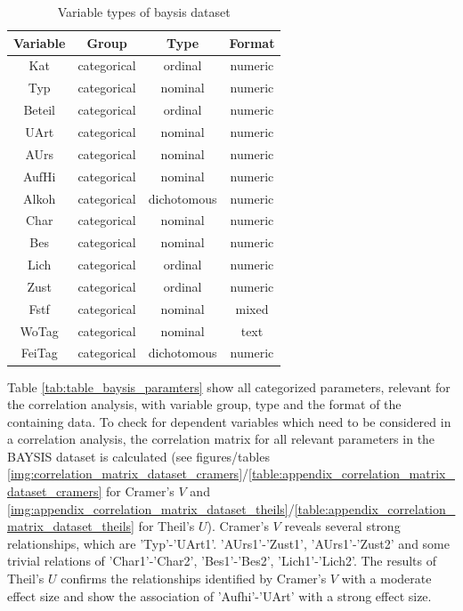 \bigskip
	
\begin{table}[ht]
	\centering
	\begin{tabular}{c|c|c|c}
		\textbf{Variable} 	& \textbf{Group} 	& \textbf{Type} & \textbf{Format} \\
		\toprule
		Kat  		& categorical 	& ordinal 	& numeric\\
		\midrule
		Typ 		& categorical 	& nominal	& numeric\\
		\midrule
		Beteil 		& categorical 	& ordinal	& numeric\\
		\midrule
		UArt 		& categorical 	& nominal	& numeric\\
		\midrule
		AUrs 		& categorical 	& nominal	& numeric\\
		\midrule
		AufHi 		& categorical 	& nominal	& numeric\\
		\midrule
		Alkoh 		& categorical 	& dichotomous	& numeric\\
		\midrule
		Char 		& categorical 	& nominal	& numeric\\
		\midrule
		Bes 		& categorical 	& nominal	& numeric\\
		\midrule
		Lich 		& categorical 	& ordinal	& numeric\\
		\midrule
		Zust 		& categorical 	& ordinal	& numeric\\
		\midrule
		Fstf 		& categorical 	& nominal	& mixed\\
		\midrule
		WoTag 		& categorical 	& nominal	& text\\
		\midrule
		FeiTag 		& categorical 	& dichotomous	& numeric\\
		\bottomrule
	\end{tabular}
	\caption{Variable types of \acrshort{baysis} dataset}
	\label{tab:table_baysis_paramters}
\end{table}

Table \autoref{tab:table_baysis_paramters} show all categorized parameters, relevant for the correlation analysis, with variable group, type and the format of the containing data. To check for dependent variables which need to be considered in a correlation analysis, the correlation matrix for all relevant parameters in the BAYSIS dataset is calculated (see figures/tables \autoref{img:correlation_matrix_dataset_cramers}/\autoref{table:appendix_correlation_matrix_dataset_cramers} for Cramer's $V$ and \autoref{img:appendix_correlation_matrix_dataset_theils}/\autoref{table:appendix_correlation_matrix_dataset_theils} for Theil's $U$). Cramer's $V$ reveals several strong relationships, which are 'Typ'-'UArt1'. 'AUrs1'-'Zust1', 'AUrs1'-'Zust2' and some  trivial relations of 'Char1'-'Char2', 'Bes1'-'Bes2', 'Lich1'-'Lich2'. The results of Theil's $U$ confirms the relationships identified by Cramer's $V$ with a moderate effect size and show the association of 'Aufhi'-'UArt' with a strong effect size. 

